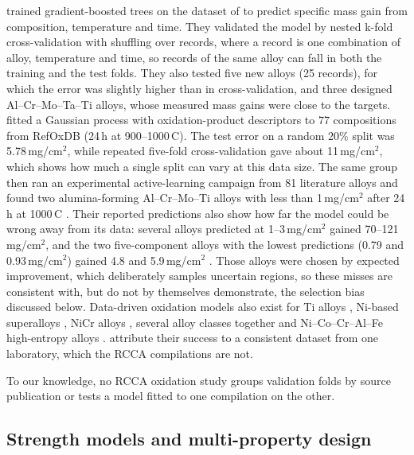 \citet{gorsse2025ml} trained gradient-boosted trees on the dataset of \citet{lin2026dataset} to predict
specific mass gain from composition, temperature and time. They validated the model by nested k-fold
cross-validation with shuffling over records, where a record is one combination of alloy,
temperature and time, so records of the same alloy can fall in both the training and the test folds.
They also tested five new alloys (25 records), for which the error was slightly higher than in
cross-validation, and three designed Al--Cr--Mo--Ta--Ti alloys, whose measured mass gains were close
to the targets. \citet{bejjipurapu2026descriptors} fitted a Gaussian process with oxidation-product
descriptors to 77 compositions from RefOxDB (24\,h at 900--1000\,\textdegree C). The test error on a
random 20\% split was 5.78\,mg/cm$^2$, while repeated five-fold cross-validation gave about
11\,mg/cm$^2$, which shows how much a single split can vary at this data size. The same group then ran
an experimental active-learning campaign from 81 literature alloys and found two alumina-forming
Al--Cr--Mo--Ti alloys with less than 1\,mg/cm$^2$ after 24\,h at 1000\,\textdegree C
\citep{bejjipurapu2025active}. Their reported predictions also show how far the model could be wrong
away from its data: several alloys predicted at 1--3\,mg/cm$^2$ gained 70--121\,mg/cm$^2$, and the two
five-component alloys with the lowest predictions (0.79 and 0.93\,mg/cm$^2$) gained 4.8 and
5.9\,mg/cm$^2$ \citep[SI Table 2]{bejjipurapu2025active}. Those alloys were chosen by expected
improvement, which deliberately samples uncertain regions, so these misses are consistent with, but do
not by themselves demonstrate, the selection bias discussed below. Data-driven oxidation models also
exist for Ti alloys \citep{bhattacharya2020ti}, Ni-based superalloys \citep{kim2021ni}, NiCr alloys
\citep{peng2021nicr}, several alloy classes together \citep{taylor2021ml} and Ni--Co--Cr--Al--Fe
high-entropy alloys \citep{tan2025nicocralfe}. \citet{peng2021nicr} attribute their success to a
consistent dataset from one laboratory, which the RCCA compilations are not.

To our knowledge, no RCCA oxidation study groups validation folds by source publication or tests a
model fitted to one compilation on the other.

\subsection{Strength models and multi-property design}

